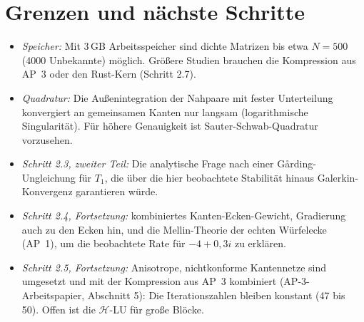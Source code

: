 \documentclass[11pt, a4paper]{article}
\begin{document}
\section{Grenzen und nächste Schritte}
\begin{itemize}[leftmargin=*]
  \item \emph{Speicher:} Mit 3\,GB Arbeitsspeicher sind dichte Matrizen bis etwa
    $N=500$ (4000 Unbekannte) möglich. Größere Studien brauchen die Kompression aus AP~3
    oder den Rust-Kern (Schritt 2.7).
  \item \emph{Quadratur:} Die Außenintegration der Nahpaare mit fester Unterteilung
    konvergiert an gemeinsamen Kanten nur langsam (logarithmische Singularität).
    Für höhere Genauigkeit ist Sauter-Schwab-Quadratur vorzusehen.
  \item \emph{Schritt 2.3, zweiter Teil:} Die analytische Frage nach einer
    Gårding-Ungleichung für $T_1$, die über die hier beobachtete Stabilität hinaus
    Galerkin-Konvergenz garantieren würde.
  \item \emph{Schritt 2.4, Fortsetzung:} kombiniertes Kanten-Ecken-Gewicht, Gradierung
    auch zu den Ecken hin, und die Mellin-Theorie der echten Würfelecke (AP~1), um die
    beobachtete Rate für $-4+0{,}3i$ zu erklären.
  \item \emph{Schritt 2.5, Fortsetzung:} Anisotrope, nichtkonforme Kantennetze sind
    umgesetzt und mit der Kompression aus AP~3 kombiniert (AP-3-Arbeitspapier,
    Abschnitt 5): Die Iterationszahlen bleiben konstant (47 bis 50). Offen ist die
    $\mathcal{H}$-LU für große Blöcke.
\end{itemize}
\end{document}
